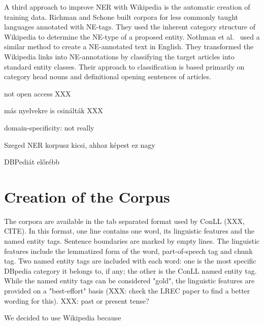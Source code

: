 \documentclass[11pt]{article}
\begin{document}
A third approach to improve NER with Wikipedia is the automatic creation of training data. Richman and Schone  built corpora for less commonly taught languages annotated with NE-tags. They used the inherent category structure of Wikipedia to determine the NE-type of a proposed entity. Nothman et al.~ used a similar method to create a NE-annotated text in English. They transformed the Wikipedia links into NE-annotations by classifying the target articles into standard entity classes. Their approach to classification is based primarily on category head nouns and definitional opening sentences of articles. 

not open access XXX

más nyelvekre is csinálták XXX

domain-specificity: not really

Szeged NER korpusz kicsi, ahhoz képest ez nagy

DBPediát előrébb 



\section{Creation of the Corpus}  %

The corpora are available in the tab separated format used by ConLL (XXX, CITE). In this format, one line contains one word, its linguistic features and the named entity tags. Sentence boundaries are marked by empty lines. The linguistic features include the lemmatized form of the word, part-of-speech tag and chunk tag. Two named entity tags are included with each word: one is the most specific DBpedia category it belongs to, if any; the other is the ConLL named entity tag. While the named entity tags can be considered "gold", the linguistic features are provided on a "best-effort" basis (XXX: check the LREC paper to find a better wording for this).
XXX: past or present tense?

We decided to use Wikipedia because
\end{document}

